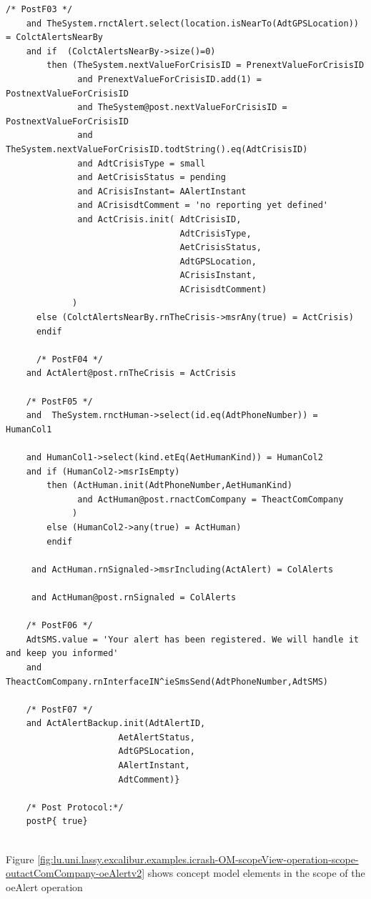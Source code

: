 \begin{lstlisting}[style=MessirStyle,firstnumber=auto,captionpos=b,caption={\msrmessir (MCL-oriented) specification of the operation \emph{oeAlert}.},label=OM-actComCompany-oeAlert-MCL-LST]
	  /* PostF03 */
	and TheSystem.rnctAlert.select(location.isNearTo(AdtGPSLocation)) = ColctAlertsNearBy
	and if  (ColctAlertsNearBy->size()=0)
	    then (TheSystem.nextValueForCrisisID = PrenextValueForCrisisID
	          and PrenextValueForCrisisID.add(1) = PostnextValueForCrisisID
	          and TheSystem@post.nextValueForCrisisID = PostnextValueForCrisisID
	          and TheSystem.nextValueForCrisisID.todtString().eq(AdtCrisisID)
	          and AdtCrisisType = small
	          and AetCrisisStatus = pending
	          and ACrisisInstant= AAlertInstant
	          and ACrisisdtComment = 'no reporting yet defined'
	          and ActCrisis.init( AdtCrisisID,
	                              AdtCrisisType,
	                              AetCrisisStatus,
	                              AdtGPSLocation,
	                              ACrisisInstant,
	                              ACrisisdtComment)
	         )
	  else (ColctAlertsNearBy.rnTheCrisis->msrAny(true) = ActCrisis)
	  endif
	
	  /* PostF04 */
	and ActAlert@post.rnTheCrisis = ActCrisis
	      
	/* PostF05 */
	and  TheSystem.rnctHuman->select(id.eq(AdtPhoneNumber)) = HumanCol1
	
	and HumanCol1->select(kind.etEq(AetHumanKind)) = HumanCol2
	and if (HumanCol2->msrIsEmpty)
	    then (ActHuman.init(AdtPhoneNumber,AetHumanKind)
	          and ActHuman@post.rnactComCompany = TheactComCompany
	         )
	    else (HumanCol2->any(true) = ActHuman)
	    endif
	    
	 and ActHuman.rnSignaled->msrIncluding(ActAlert) = ColAlerts
	 
	 and ActHuman@post.rnSignaled = ColAlerts
	
	/* PostF06 */
	AdtSMS.value = 'Your alert has been registered. We will handle it and keep you informed'
	and TheactComCompany.rnInterfaceIN^ieSmsSend(AdtPhoneNumber,AdtSMS)
	
	/* PostF07 */
	and ActAlertBackup.init(AdtAlertID,
	                  AetAlertStatus,
	                  AdtGPSLocation,
	                  AAlertInstant,
	                  AdtComment)}
	
	/* Post Protocol:*/ 
	postP{ true}
	
	\end{lstlisting}
	\normalsize 
	
	
	
	





Figure \ref{fig:lu.uni.lassy.excalibur.examples.icrash-OM-scopeView-operation-scope-outactComCompany-oeAlertv2}
shows concept model elements in the scope of the oeAlert operation

